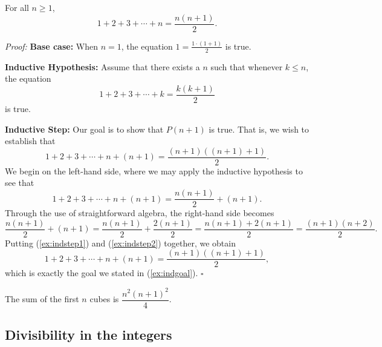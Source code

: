 \documentclass[english,course]{lecture}
\renewcommand{\le}{\leqslant}
\renewcommand{\ge}{\geqslant}
\newenvironment{hint}{\startimportant}{}
\def\startimportant#1\end{[{Hint:} #1]\end}
\theoremstyle{plain}
\def\presnotes{}
\begin{document}
\begin{example}
	For all $n \ge 1$, 
	\[
		1+ 2 + 3 + \cdots + n = \frac{n(n+1)}{2}.
	\]
\end{example}

\noindent\emph{Proof:}
	\textbf{Base case:} When $n = 1$, the equation $1 = \frac{1\cdot (1+1)}{2}$ is true.
	
	\textbf{Inductive Hypothesis:} Assume that there exists a $n$ such that whenever $k \le n$, the equation
	\[
		1+ 2 + 3 + \cdots + k = \frac{k(k+1)}{2}
	\]
	is true.
	
	\textbf{Inductive Step:} Our goal is to show that $P(n+1)$ is true. That is, we wish to establish that
	\begin{equation}\label{ex:indgoal}
		1+ 2 + 3 + \cdots + n + (n+1) = \frac{(n+1)((n+1)+1)}{2}.
	\end{equation}
	We begin on the left-hand side, where we may apply the inductive hypothesis to see that
	\begin{equation}\label{ex:indstep1}
		1+ 2 + 3 + \cdots + n + (n+1) = \frac{n(n+1)}{2} + (n+1).
	\end{equation}
	Through the use of straightforward algebra, the right-hand side becomes 
	\begin{equation}\label{ex:indstep2}
		\frac{n(n+1)}{2} + (n+1) = \frac{n(n+1)}{2} + \frac{2(n+1)}{2} = \frac{n(n+1) + 2(n+1)}{2} = \frac{(n+1)(n+2)}{2}.
	\end{equation}
	Putting (\ref{ex:indstep1}) and (\ref{ex:indstep2}) together, we obtain
	\[
		1+ 2 + 3 + \cdots + n + (n+1) = \frac{(n+1)((n+1)+1)}{2},
	\]
	which is exactly the goal we stated in (\ref{ex:indgoal}).
\hfill $\square$

\begin{exer}
	The sum of the first $n$ cubes is $\dfrac{n^2(n+1)^2}{4}$.
\end{exer}

\presnotes


\presnotes








\subsection{Divisibility in the integers}\label{SubSec-Divisibility-in-the-Integers}
\end{document}
